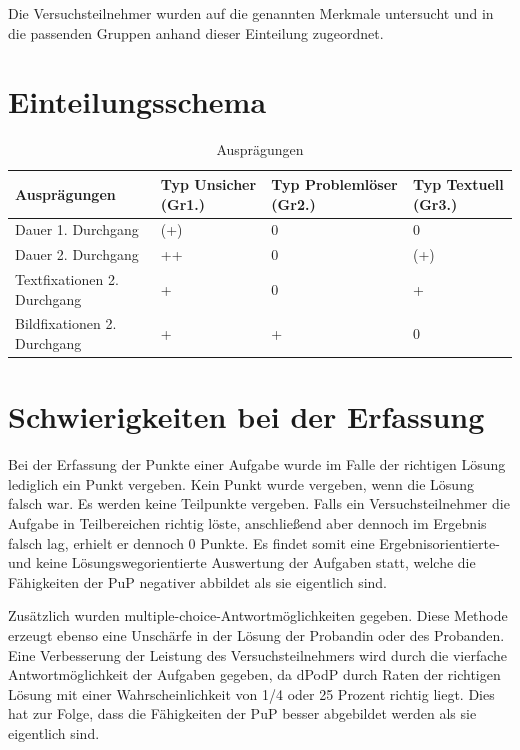 Die Versuchsteilnehmer wurden auf die genannten Merkmale untersucht und in die passenden Gruppen anhand dieser Einteilung zugeordnet.
\section*{Einteilungsschema}

\begin{table}[!h]
\hspace{-5pt}
\begin{tabularx}{\textwidth + 5pt}{| @{\hspace{3pt}} M || @{\hspace{3pt}} M  | @{\hspace{3pt}} M  | @{\hspace{3pt}} M |}
\hline
\textbf{Ausprägungen} & \textbf{Typ Unsicher (Gr1.)} & \textbf{Typ Problemlöser (Gr2.)} & \textbf{Typ Textuell (Gr3.)}\\
\hline
\hline
Dauer 1. Durchgang          & (+) & 0 & 0\\
\hline
Dauer 2. Durchgang          & ++ & 0 & (+)\\
\hline
Textfixationen 2. Durchgang & + & 0 & +\\
\hline
Bildfixationen 2. Durchgang & + & + & 0\\
\hline
\end{tabularx}
\caption{Ausprägungen}
\end{table}



\section{Schwierigkeiten bei der Erfassung}

Bei der Erfassung der Punkte einer Aufgabe wurde im Falle der richtigen Lösung lediglich ein Punkt vergeben. Kein Punkt wurde vergeben, wenn die Lösung falsch war. Es werden keine Teilpunkte vergeben. Falls ein Versuchsteilnehmer die Aufgabe in Teilbereichen richtig löste, anschließend aber dennoch im Ergebnis falsch lag, erhielt er dennoch 0 Punkte. Es findet somit eine Ergebnisorientierte- und keine Lösungswegorientierte Auswertung der Aufgaben statt, welche die Fähigkeiten der \gls{PuP} negativer abbildet als sie eigentlich sind.

Zusätzlich wurden multiple-choice-Antwortmöglichkeiten gegeben. Diese Methode erzeugt ebenso eine Unschärfe in der Lösung der Probandin oder des Probanden. Eine Verbesserung der Leistung des Versuchsteilnehmers wird durch die vierfache Antwortmöglichkeit der Aufgaben gegeben, da \gls{dPodP} durch Raten der richtigen Lösung mit einer Wahrscheinlichkeit von 1/4 oder 25 Prozent richtig liegt. Dies hat zur Folge, dass die Fähigkeiten der \gls{PuP} besser abgebildet werden als sie eigentlich sind.  

